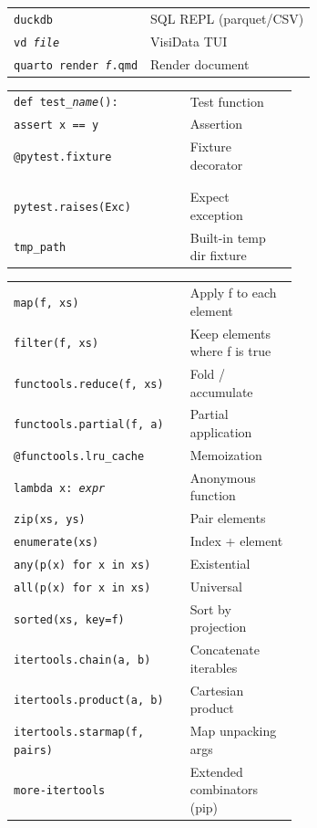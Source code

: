 \documentclass[10pt]{extarticle}
\begin{document}
\begin{multicols}{2}
\begin{tabularx}{\linewidth}{@{}l@{\enspace}Y@{}}
\texttt{duckdb}                        & SQL REPL (parquet/CSV) \\
\texttt{vd \textit{file}}             & VisiData TUI \\
\texttt{quarto render \textit{f}.qmd} & Render document \\
\end{tabularx}

\begin{tabularx}{\linewidth}{@{}>{\raggedright\arraybackslash}p{0.62\linewidth}@{\enspace}Y@{}}
\texttt{def test\_\textit{name}():}    & Test function \\
\texttt{assert x == y}                & Assertion \\
\texttt{@pytest.fixture}              & Fixture decorator \\
 & \\
 \\
\texttt{pytest.raises(Exc)}           & Expect exception \\
\texttt{tmp\_path}                    & Built-in temp dir fixture \\
\end{tabularx}

\begin{tabularx}{\linewidth}{@{}>{\raggedright\arraybackslash}p{0.62\linewidth}@{\enspace}Y@{}}
\texttt{map(f, xs)}                   & Apply f to each element \\
\texttt{filter(f, xs)}                & Keep elements where f is true \\
\texttt{functools.reduce(f, xs)}      & Fold / accumulate \\
\texttt{functools.partial(f, a)}      & Partial application \\
\texttt{@functools.lru\_cache}        & Memoization \\
\texttt{lambda x: \textit{expr}}      & Anonymous function \\
\texttt{zip(xs, ys)}                  & Pair elements \\
\texttt{enumerate(xs)}                & Index + element \\
\texttt{any(p(x) for x in xs)}       & Existential \\
\texttt{all(p(x) for x in xs)}       & Universal \\
\texttt{sorted(xs, key=f)}           & Sort by projection \\
\texttt{itertools.chain(a, b)}        & Concatenate iterables \\
\texttt{itertools.product(a, b)}      & Cartesian product \\
\texttt{itertools.starmap(f, pairs)}  & Map unpacking args \\
\texttt{more-itertools}               & Extended combinators (pip) \\
\end{tabularx}


\end{multicols}
\end{document}
